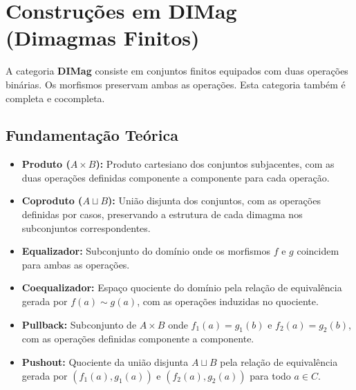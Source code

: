 \section{Construções em DIMag (Dimagmas Finitos)}

A categoria \textbf{DIMag} consiste em conjuntos finitos equipados com duas operações binárias. Os morfismos preservam ambas as operações. Esta categoria também é completa e cocompleta.

\subsection{Fundamentação Teórica}
\begin{itemize}
    \item \textbf{Produto ($A \times B$):} Produto cartesiano dos conjuntos subjacentes, com as duas operações definidas componente a componente para cada operação.
    \item \textbf{Coproduto ($A \sqcup B$):} União disjunta dos conjuntos, com as operações definidas por casos, preservando a estrutura de cada dimagma nos subconjuntos correspondentes.
    \item \textbf{Equalizador:} Subconjunto do domínio onde os morfismos $f$ e $g$ coincidem para ambas as operações.
    \item \textbf{Coequalizador:} Espaço quociente do domínio pela relação de equivalência gerada por $f(a) \sim g(a)$, com as operações induzidas no quociente.
    \item \textbf{Pullback:} Subconjunto de $A \times B$ onde $f_1(a) = g_1(b)$ e $f_2(a) = g_2(b)$, com as operações definidas componente a componente.
    \item \textbf{Pushout:} Quociente da união disjunta $A \sqcup B$ pela relação de equivalência gerada por $(f_1(a), g_1(a))$ e $(f_2(a), g_2(a))$ para todo $a \in C$.
\end{itemize}

